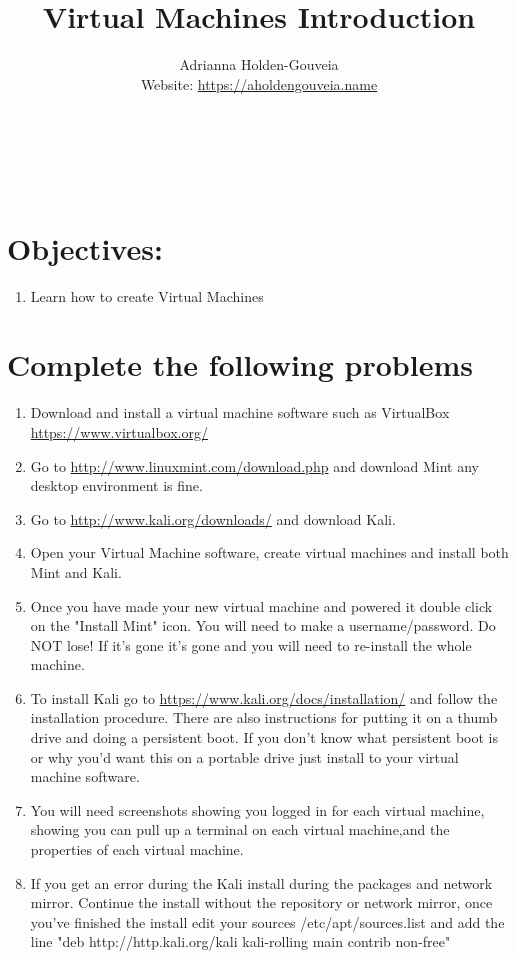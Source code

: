 \documentclass[12pt]{article}
\title{Virtual Machines Introduction}
\author{
        Adrianna Holden-Gouveia \\
        Website: \url{https://aholdengouveia.name}\\ 
        \date{\vspace{-5ex}}
        \faLinkedin{: aholdengouveia} \\
        \faGithub {: aholdengouveia} \\
        \faTwitter {: aholdengouveia} \\
        }
\begin{document}
    

\maketitle


\section*{Objectives:}
\begin{enumerate}
    \item Learn how to create Virtual Machines
\end{enumerate}
\section*{Complete the following problems}

\begin{enumerate}
    \item Download and install a virtual machine software such as VirtualBox \url {https://www.virtualbox.org/}
    \item Go to  \url{http://www.linuxmint.com/download.php} and download Mint  any desktop environment is fine.
    \item Go to \url{http://www.kali.org/downloads/}   and download Kali.
    \item Open your Virtual Machine software, create virtual machines and install both Mint and Kali.
    \item Once you have made your new virtual machine and powered it double click on the "Install Mint" icon.  You will need to make a username/password. Do NOT lose! If it's gone it's gone and you will need to re-install the whole machine.
    \item To install Kali go to \url{https://www.kali.org/docs/installation/} and follow the installation procedure.  There are also instructions for putting it on a thumb drive and doing a persistent boot.  If you don't know what persistent boot is or why you'd want this on a portable drive just install to your virtual machine software.
    \item You will need screenshots showing you logged in for each virtual machine, showing you can pull up a terminal on each virtual machine,and the properties of each virtual machine.
    \item If you get an error during the Kali install during the packages and network mirror. Continue the install without the repository or network mirror, once you've finished the install edit your sources /etc/apt/sources.list and add the line "deb http://http.kali.org/kali kali-rolling main contrib non-free"  

\end{enumerate}
\end{document}
